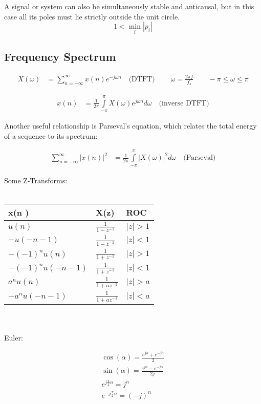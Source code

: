 A signal or system
can also be simultaneously stable and anticausal, but in this case all its poles must lie
strictly outside the unit circle.
\[ 1 < \min\limits_{i}|p_i| \]

\subsection{Frequency Spectrum}
\begin{align*}
	X(\omega)&= \sum\limits_{n=-\infty}^{\infty} x(n)e^{-j\omega n} \quad \text{(DTFT)} \
	\qquad \omega = \frac{2 \pi f}{f_s} \qquad -\pi \leq \omega \leq \pi
\end{align*}

\begin{align*}
	x(n)&= \frac{1}{2\pi} \int\limits_{-\pi}^{\pi} X(\omega)e^{j\omega n} d\omega \quad \text{(inverse DTFT)} 
\end{align*}

Another useful relationship is Parseval’s equation, which relates the total energy of
a sequence to its spectrum:

\begin{align*}
	\sum_{n=-\infty}^{\infty} |x(n)|^2&= \frac{1}{2\pi} \int\limits_{-\pi}^{\pi} |X(\omega)|^2 d\omega \quad \text{(Parseval)} 
\end{align*}

Some Z-Transforms: \\ \\
\begin{tabularx}{0.6\textwidth}{|X|X|X|}
	\hline
	\textbf{x(n} ) & \textbf{X(z}) & \textbf{ROC} \\
	\hline
	$u(n)$ & $\frac{1}{1 - z^{-1}}$ & $|z|>1$ \\
	\hline
	$-u(-n-1)$ & $\frac{1}{1 - z^{-1}}$ & $|z|<1$ \\
	\hline
	$-(-1)^n u(n)$ & $\frac{1}{1 + z^{-1}}$ & $|z|>1$ \\
	\hline
	$-(-1)^n u(-n-1)$ & $\frac{1}{1 + z^{-1}}$ & $|z|<1$ \\
	\hline
	$a^n u(n)$ & $\frac{1}{1 + az^{-1}}$ & $|z|>a$ \\
	\hline
	$-a^n u(-n-1)$ & $\frac{1}{1 + az^{-1}}$ & $|z|<a$ \\
	\hline
\end{tabularx}\\ \\

Euler: 

\begin{align*}
	\cos(\alpha) = \frac{e^{j\alpha} + e^{-j\alpha}}{2} \\
	\sin(\alpha) = \frac{e^{j\alpha} - e^{-j\alpha}}{2j} \\
	e^{j\frac{\pi}{2}n} = j^n\\
	e^{-j\frac{\pi}{2}n} = (-j)^n\\
\end{align*}

